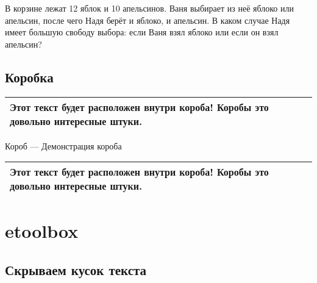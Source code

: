\documentclass[12pt, a4paper]{article}
\renewcommand{\arraystretch}{1.3} %
\theoremstyle{plain}              %
\theoremstyle{definition}         %
\begin{document}
\begin{exercise}
В корзине лежат 12 яблок и 10 апельсинов. Ваня выбирает из неё яблоко или апельсин, после чего Надя берёт и яблоко, и апельсин. В каком случае Надя имеет большую свободу выбора: если Ваня взял яблоко или если он взял апельсин?  
\end{exercise}


\subsection{Коробка} 

\newenvironment{korob}
    {\renewcommand{\arraystretch}{1}
    \begin{center}
    \begin{tabular}{|p{0.9\textwidth}|}
    \hline \vspace{1pt} 
    }{ 
    \vspace{5pt} \\ \hline 
    \end{tabular} 
    \end{center}
    }

 
\begin{korob}
Этот текст будет расположен внутри короба! Коробы это довольно интересные штуки.  
\end{korob}


\newenvironment{korob2}[1]
    {\renewcommand{\arraystretch}{1}
    \begin{center}
    \addtocounter{ikorob}{1} 
    Короб  \arabic{ikorob} --- #1 \\[1ex]
    \begin{tabular}{|p{0.9\textwidth}|}
    \hline \vspace{1pt} 
    }{ 
    \vspace{5pt} \\ \hline 
    \end{tabular} 
    \end{center}
    }
 
\begin{korob2}{Демонстрация короба}
Этот текст будет расположен внутри короба! Коробы это довольно интересные штуки.  
\end{korob2}



\section{etoolbox}
\subsection{Скрываем кусок текста} 
\end{document}
